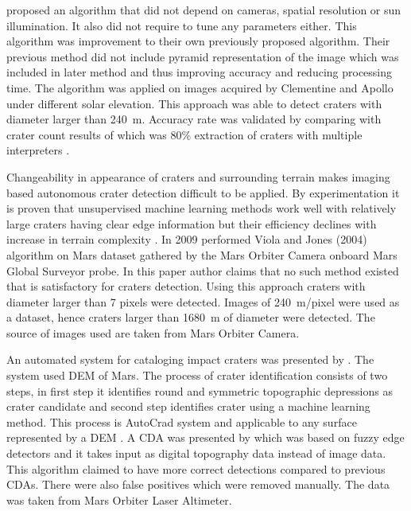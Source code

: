 \documentclass[11pt]{article}
\begin{document}
\cite{sawabe_2006} proposed an algorithm that did not depend on cameras, spatial resolution or sun illumination. It also did not require to tune any parameters either. This algorithm was improvement to their own previously proposed algorithm. Their previous method did not include pyramid representation of the image which was included in later method and thus improving accuracy and reducing processing time. The algorithm was applied on images acquired by Clementine and Apollo under different solar elevation. This approach was able to detect craters with diameter larger than \SI{240}{m}. Accuracy rate was validated by comparing with crater count results of \cite{neukum1975cratering} which was 80\% extraction of craters with multiple interpreters \cite{sawabe_2006}. 

Changeability in appearance of craters and surrounding terrain makes imaging based autonomous crater detection difficult to be applied. By experimentation it is proven that unsupervised machine learning methods work well with relatively large craters having clear edge information but their efficiency declines with increase in terrain complexity \cite{meng2009method}. In 2009 \cite{martins2009crater} performed Viola and Jones (2004) algorithm on Mars dataset gathered by the Mars Orbiter Camera onboard Mars Global Surveyor probe. In this paper author claims that no such method existed that is satisfactory for craters detection. Using this approach craters with diameter larger than 7 pixels were detected. Images of \SI{240}{m}/pixel were used as a dataset, hence craters larger than \SI{1680}{m} of diameter were detected. The source of images used are taken from Mars Orbiter Camera.

An automated system for cataloging impact craters was presented by \cite{stepinski2009machine}. The system used DEM of Mars. The process of crater identification consists of two steps, in first step it identifies round and symmetric topographic depressions as crater candidate and second step identifies crater using a machine learning method. This process is AutoCrad system and applicable to any surface represented by a DEM \cite{stepinski2009machine}. A CDA was presented by \cite{salamuniccar2010method} which was based on fuzzy edge detectors and it takes input as digital topography data instead of image data. This algorithm claimed to have more correct detections compared to previous CDAs. There were also false positives which were removed manually. The data was taken from Mars Orbiter Laser Altimeter.
\end{document}
